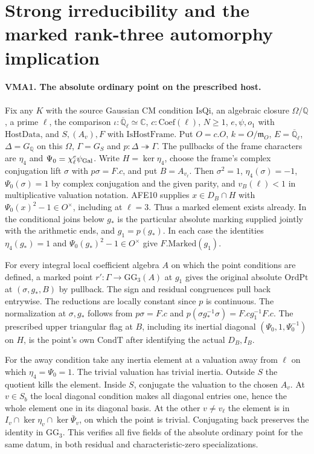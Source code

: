 \section{Strong irreducibility and the marked rank-three automorphy implication}
\label{sec:markedaut-v64}

\paragraph{VMA1. The absolute ordinary point on the prescribed host.}
\label{claim:VMA1}
Fix any $K$ with the source Gaussian CM condition $\mathrm{IsQi}$,
an algebraic closure $\Omega/\mathbb Q$, a prime $\ell$, the
comparison $\iota:\overline{\mathbb Q}_\ell\simeq\mathbb C$,
$c:\mathrm{Coef}(\ell)$, $N\ge1$, $e,\psi,o_1$ with
$\mathrm{HostData}$, and $S,(A_v),F$ with $\mathrm{IsHostFrame}$.
Put $O=c.O$, $k=O/\mathfrak m_O$, $E=\overline{\mathbb Q}_\ell$,
$\Delta=G_{\mathbb Q}$ on this $\Omega$, $\Gamma=G_S$ and
$p:\Delta\twoheadrightarrow\Gamma$. The pullbacks of the frame
characters are $\eta_4$ and $\Psi_0=\chi_\ell^e\psi_{\rm Gal}$.
Write $H=\ker\eta_4$, choose the frame's complex conjugation lift
$\sigma$ with $p\sigma=F.c$, and put $B=A_{v_\ell}$. Then
$\sigma^2=1$, $\eta_4(\sigma)=-1$, $\Psi_0(\sigma)=1$ by
complex conjugation and the given parity, and $v_B(\ell)<1$ in
multiplicative valuation notation. AFE10 supplies
$x\in D_B\cap H$ with $\Psi_0(x)^2-1\in O^\times$, including
at $\ell=3$. Thus a marked element exists already. In the
conditional joins below $g_*$ is the particular absolute marking
supplied jointly with the arithmetic ends, and $g_1=p(g_*)$.
In each case the identities $\eta_4(g_*)=1$ and
$\Psi_0(g_*)^2-1\in O^\times$ give $F.\mathrm{Marked}(g_1)$.

For every integral local coefficient algebra $A$ on which the point
conditions are defined, a marked point $r':\Gamma\to\mathrm{GG}_3(A)$
at $g_1$ gives the original absolute $\mathrm{OrdPt}$ at
$(\sigma,g_*,B)$ by pullback. The sign and residual congruences
pull back entrywise. The reductions are locally constant since
$p$ is continuous. The normalization at $\sigma,g_*$ follows from
$p\sigma=F.c$ and $p(\sigma g_*^{-1}\sigma)=F.c g_1^{-1}F.c$.
The prescribed upper triangular flag at $B$, including its inertial
diagonal $(\Psi_0,1,\Psi_0^{-1})$ on $H$, is the point's own
$\mathrm{CondT}$ after identifying the actual $D_B,I_B$.

For the away condition take any inertia element at a valuation
away from $\ell$ on which $\eta_4=\Psi_0=1$. The trivial
valuation has trivial inertia. Outside $S$ the quotient kills
the element. Inside $S$, conjugate the valuation to the chosen
$A_v$. At $v\in S_b$ the local diagonal condition makes all
diagonal entries one, hence the whole element one in its diagonal
basis. At the other $v\ne v_\ell$ the element is in
$I_v\cap\ker\eta_v\cap\ker\bar\Psi_v$, on which the point is
trivial. Conjugating back preserves the identity in $\mathrm{GG}_3$.
This verifies all five fields of the absolute ordinary point for the
same datum, in both residual and characteristic-zero specializations.

